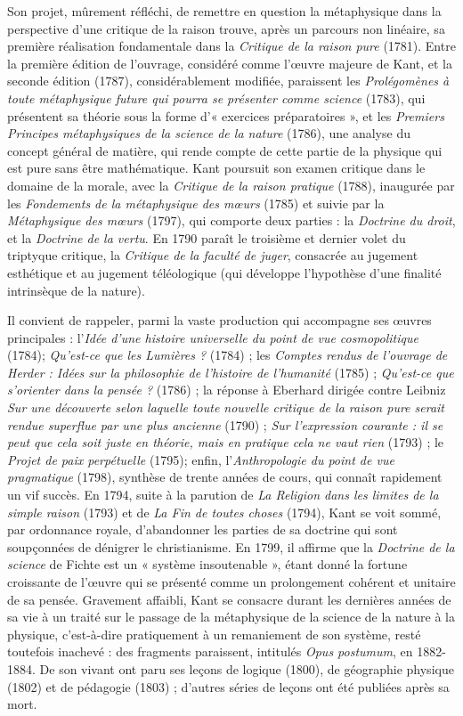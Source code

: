 Son projet, mûrement réfléchi, de
remettre en question la métaphysique
dans la perspective d’une critique de la
raison trouve, après un parcours non
linéaire, sa première réalisation fondamentale
dans la {\it Critique de la raison pure}
(1781). Entre la première édition de l’ouvrage,
considéré comme l’œuvre majeure
de Kant, et la seconde édition (1787),
considérablement modifiée, paraissent les
{\it Prolégomènes à toute métaphysique future
qui pourra se présenter comme science}
(1783), qui présentent sa théorie sous la
forme d’« exercices préparatoires », et les
{\it Premiers Principes métaphysiques de la
science de la nature} (1786), une analyse du
concept général de matière, qui rende
compte de cette partie de la physique qui
est pure sans être mathématique. Kant
poursuit son examen critique dans le
domaine de la morale, avec la {\it Critique de
la raison pratique} (1788), inaugurée par
les {\it Fondements de la métaphysique des
mœurs} (1785) et suivie par la {\it Métaphysique
des mœurs} (1797), qui comporte
deux parties : la {\it Doctrine du droit}, et la
{\it Doctrine de la vertu}. En 1790 paraît le
troisième et dernier volet du triptyque critique,
la {\it Critique de la faculté de juger},
consacrée au jugement esthétique et au
jugement téléologique (qui développe
l’hypothèse d’une finalité intrinsèque de
la nature).

Il convient de rappeler, parmi la vaste
production qui accompagne ses œuvres
principales : l’{\it Idée d’une histoire universelle
du point de vue cosmopolitique}
(1784); {\it Qu'est-ce que les Lumières ?}
(1784) ; les {\it Comptes rendus de l'ouvrage
de Herder : Idées sur la philosophie de
l’histoire de l'humanité} (1785) ; {\it Qu'est-ce
que s'orienter dans la pensée ?} (1786) ; la
réponse à Eberhard dirigée contre Leibniz
{\it Sur une découverte selon laquelle toute
nouvelle critique de la raison pure serait
rendue superflue par une plus ancienne}
(1790) ; {\it Sur l'expression courante : il se
peut que cela soit juste en théorie, mais en
pratique cela ne vaut rien} (1793) ; le {\it Projet
de paix perpétuelle} (1795); enfin,
l’{\it Anthropologie du point de vue pragmatique}
(1798), synthèse de trente années de
cours, qui connaît rapidement un vif
succès. En 1794, suite à la parution de {\it La
Religion dans les limites de la simple raison}
(1793) et de {\it La Fin de toutes choses}
(1794), Kant se voit sommé, par ordonnance
royale, d'abandonner les parties de
sa doctrine qui sont soupçonnées de dénigrer
le christianisme. En 1799, il affirme
que la {\it Doctrine de la science} de Fichte est
un « système insoutenable », étant donné
la fortune croissante de l’œuvre qui se
présenté comme un prolongement cohérent
et unitaire de sa pensée. Gravement
affaibli, Kant se consacre durant les dernières
années de sa vie à un traité sur le
passage de la métaphysique de la science
de la nature à la physique, c’est-à-dire
pratiquement à un remaniement de son
système, resté toutefois inachevé : des
fragments paraissent, intitulés {\it Opus postumum},
en 1882-1884. De son vivant ont
paru ses leçons de logique (1800), de géographie
physique (1802) et de pédagogie
(1803) ; d’autres séries de leçons ont été
publiées après sa mort.

